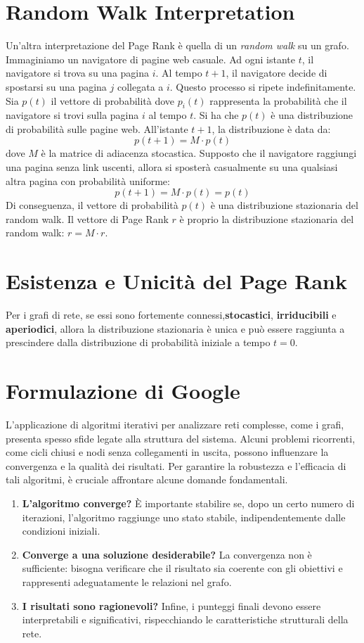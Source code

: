 \documentclass{report}
\begin{document}
	\section{Random Walk Interpretation}
	Un'altra interpretazione del Page Rank è quella di un \textit{random walk} su un grafo. Immaginiamo un navigatore di pagine web casuale. Ad ogni istante $t$, il navigatore si trova su una pagina $i$. Al tempo $t+1$, il navigatore decide di spostarsi su una pagina $j$ collegata a $i$. Questo processo si ripete indefinitamente.
	\vspace{\baselineskip}\\
	Sia $p(t)$ il vettore di probabilità dove $p_i(t)$ rappresenta la probabilità che il navigatore si trovi sulla pagina $i$ al tempo $t$. Si ha che $p(t)$ è una distribuzione di probabilità sulle pagine web. All'istante $t+1$, la distribuzione è data da:
	\[
	p(t+1) = M \cdot p(t)
	\]
	dove $M$ è la matrice di adiacenza stocastica. Supposto che il navigatore raggiungi una pagina senza link uscenti, allora si sposterà casualmente su una qualsiasi altra pagina con probabilità uniforme:
	\[
	p(t+1) = M \cdot p(t) = p(t)
	\]
	Di conseguenza, il vettore di probabilità $p(t)$ è una distribuzione stazionaria del random walk. Il vettore di Page Rank $r$ è proprio la distribuzione stazionaria del random walk: $r = M \cdot r$.

	\section{Esistenza e Unicità del Page Rank}
	Per i grafi di rete, se essi sono fortemente connessi,\textbf{stocastici}, \textbf{irriducibili} e \textbf{aperiodici}, allora la distribuzione stazionaria è unica e può essere raggiunta a prescindere dalla distribuzione di probabilità iniziale a tempo $t=0$.

	\section{Formulazione di Google}
	L'applicazione di algoritmi iterativi per analizzare reti complesse, come i grafi, presenta spesso sfide legate alla struttura del sistema. Alcuni problemi ricorrenti, come cicli chiusi e nodi senza collegamenti in uscita, possono influenzare la convergenza e la qualità dei risultati. Per garantire la robustezza e l'efficacia di tali algoritmi, è cruciale affrontare alcune domande fondamentali.
	\begin{enumerate}
    \item \textbf{L'algoritmo converge?}  
    È importante stabilire se, dopo un certo numero di iterazioni, l'algoritmo raggiunge uno stato stabile, indipendentemente dalle condizioni iniziali.
    \item \textbf{Converge a una soluzione desiderabile?}  
    La convergenza non è sufficiente: bisogna verificare che il risultato sia coerente con gli obiettivi e rappresenti adeguatamente le relazioni nel grafo.
    \item \textbf{I risultati sono ragionevoli?}  
    Infine, i punteggi finali devono essere interpretabili e significativi, rispecchiando le caratteristiche strutturali della rete.
	\end{enumerate}
\end{document}
